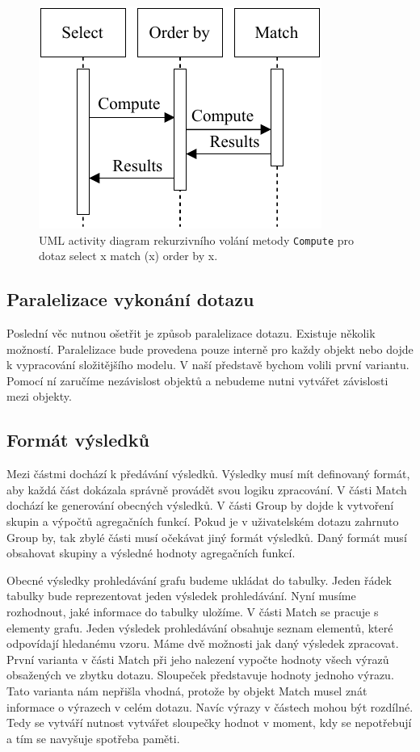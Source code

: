 \begin{figure}[!htp]
\includegraphics{../img/diaQueryObjectsCall.pdf}\centering
\caption{UML activity diagram rekurzivního volání metody \texttt{Compute} pro dotaz select x match (x) order by x.}
\label{figure.diaQueryObjectsCall}
\end{figure}

\subsection{Paralelizace vykonání dotazu}

Poslední věc nutnou ošetřit je způsob paralelizace dotazu.
Existuje několik možností.
Paralelizace bude provedena pouze interně pro každy objekt nebo dojde k vypracování složitějšího modelu.
V naší představě bychom volili první variantu.
Pomocí ní zaručíme nezávislost objektů a nebudeme nutni vytvářet závislosti mezi objekty.

\subsection{Formát výsledků} \label{anal.tables}

Mezi částmi dochází k předávání výsledků.
Výsledky musí mít definovaný formát, aby každá část dokázala správně provádět svou logiku zpracování.
V části Match dochází ke generování obecných výsledků.
V části Group by dojde k vytvoření skupin a výpočtů agregačních funkcí.
Pokud je v uživatelském dotazu zahrnuto Group by, tak zbylé části musí očekávat jiný formát výsledků.
Daný formát musí obsahovat skupiny a výsledné hodnoty agregačních funkcí.

Obecné výsledky prohledávání grafu budeme ukládat do tabulky.
Jeden řádek tabulky bude reprezentovat jeden výsledek prohledávání.
Nyní musíme rozhodnout, jaké informace do tabulky uložíme.
V části Match se pracuje s elementy grafu.
Jeden výsledek prohledávání obsahuje seznam elementů, které odpovídají hledanému vzoru.
Máme dvě možnosti jak daný výsledek zpracovat.
První varianta v části Match při jeho nalezení vypočte hodnoty všech výrazů obsažených ve zbytku dotazu.
Sloupeček představuje hodnoty jednoho výrazu.
Tato varianta nám nepřišla vhodná, protože by objekt Match musel znát informace o výrazech v celém dotazu.
Navíc výrazy v částech mohou být rozdílné.
Tedy se vytváří nutnost vytvářet sloupečky hodnot v moment, kdy se nepotřebují a tím se navyšuje spotřeba paměti.

